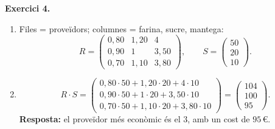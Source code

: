 \documentclass[12pt,a4paper]{article}
\newcommand{\blocInici}{%
  \par\nobreak\vspace{0pt}%
  \begin{minipage}[t]{\linewidth}%
}
\newcommand{\blocFi}{%
  \end{minipage}%
  \par
}
\begin{document}
%
\blocInici
\noindent\textbf{Exercici 4.}
\begin{enumerate}[label=\alph*),leftmargin=1.2em,itemsep=0.35em]
  \item Files = proveïdors; columnes = farina, sucre, mantega:
    \[
      R =
      \begin{pmatrix}
        0{,}80 & 1{,}20 & 4 \\
        0{,}90 & 1 & 3{,}50 \\
        0{,}70 & 1{,}10 & 3{,}80
      \end{pmatrix},
      \qquad
      S =
      \begin{pmatrix} 50 \\ 20 \\ 10 \end{pmatrix}.
    \]
  \item
    \[
      R \cdot S =
      \begin{pmatrix}
        0{,}80\cdot 50 + 1{,}20\cdot 20 + 4\cdot 10 \\
        0{,}90\cdot 50 + 1\cdot 20 + 3{,}50\cdot 10 \\
        0{,}70\cdot 50 + 1{,}10\cdot 20 + 3{,}80\cdot 10
      \end{pmatrix}
      =
      \begin{pmatrix} 104 \\ 100 \\ 95 \end{pmatrix}.
    \]
    \textbf{Resposta:} el proveïdor més econòmic és el $3$, amb un cost de $95$\,\euro{}.
\end{enumerate}
\blocFi

\vspace{0.7em}
\end{document}
